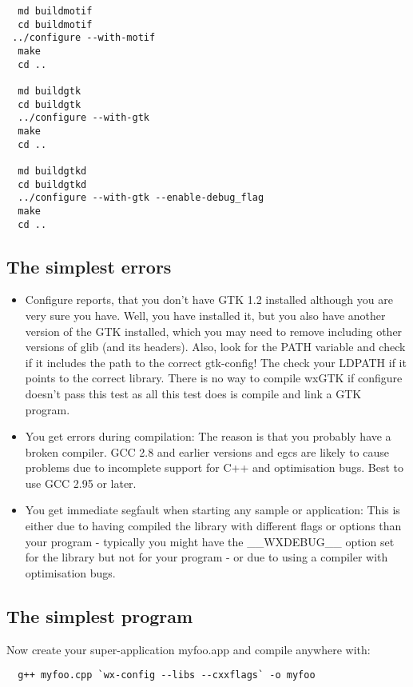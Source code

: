 \begin{verbatim}
  md buildmotif
  cd buildmotif
 ../configure --with-motif
  make
  cd ..

  md buildgtk
  cd buildgtk
  ../configure --with-gtk
  make
  cd ..

  md buildgtkd
  cd buildgtkd
  ../configure --with-gtk --enable-debug_flag
  make
  cd ..
\end{verbatim}

\subsection{The simplest errors}

\begin{itemize}\itemsep=0pt
\item Configure reports, that you don't have GTK 1.2 installed although you are 
very sure you have. Well, you have installed it, but you also have another 
version of the GTK installed, which you may need to remove including other 
versions of glib (and its headers). Also, look for the PATH variable and check 
if it includes the path to the correct gtk-config! The check your LDPATH if it 
points to the correct library. There is no way to compile wxGTK if configure 
doesn't pass this test as all this test does is compile and link a GTK program.
\item You get errors during compilation: The reason is that you probably have a
broken compiler.  GCC 2.8 and earlier versions and egcs are likely to cause
problems due to incomplete support for C++ and optimisation bugs.  Best to use
GCC 2.95 or later.
\item You get immediate segfault when starting any sample or application: This is
either due to having compiled the library with different flags or options than
your program - typically you might have the \_\_WXDEBUG\_\_ option set for the
library but not for your program - or due to using a compiler with optimisation
bugs.
\end{itemize}

\subsection{The simplest program}

Now create your super-application myfoo.app and compile anywhere with:

\begin{verbatim}
  g++ myfoo.cpp `wx-config --libs --cxxflags` -o myfoo
\end{verbatim}

